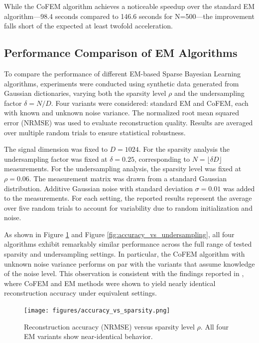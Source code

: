 \documentclass{article}
\begin{document}
While the CoFEM algorithm achieves a noticeable speedup over the standard EM algorithm—98.4 seconds compared to 146.6 seconds for N=500—the improvement falls short of the expected at least twofold acceleration.

\subsection{Performance Comparison of EM Algorithms}

To compare the performance of different EM-based Sparse Bayesian Learning algorithms, experiments were conducted using synthetic data generated from Gaussian dictionaries, varying both the sparsity level $ \rho $ and the undersampling factor $ \delta = N/D $. Four variants were considered: standard EM and CoFEM, each with known and unknown noise variance. The normalized root mean squared error (NRMSE) was used to evaluate reconstruction quality. Results are averaged over multiple random trials to ensure statistical robustness.

The signal dimension was fixed to $ D = 1024 $. For the sparsity analysis the undersampling factor was fixed at $ \delta = 0.25 $, corresponding to $ N = \lfloor \delta D \rfloor $ measurements. For the undersampling analysis, the sparsity level was fixed at $ \rho = 0.06 $. The measurement matrix was drawn from a standard Gaussian distribution. Additive Gaussian noise with standard deviation $ \sigma = 0.01 $ was added to the measurements. For each setting, the reported results represent the average over five random trials to account for variability due to random initialization and noise.

As shown in Figure \ref{fig:accuracy_vs_sparsity} and Figure \ref{fig:accuracy_vs_undersampling}, all four algorithms exhibit remarkably similar performance across the full range of tested sparsity and undersampling settings. In particular, the CoFEM algorithm with unknown noise variance performs on par with the variants that assume knowledge of the noise level. This observation is consistent with the findings reported in \cite{lin2022covariance}, where CoFEM and EM methods were shown to yield nearly identical reconstruction accuracy under equivalent settings.

\begin{figure}[h]
    \centering
    \texttt{[image: figures/accuracy\_vs\_sparsity.png]}
    \caption{Reconstruction accuracy (NRMSE) versus sparsity level $ \rho $. All four EM variants show near-identical behavior.}
    \label{fig:accuracy_vs_sparsity}
\end{figure}
\end{document}
